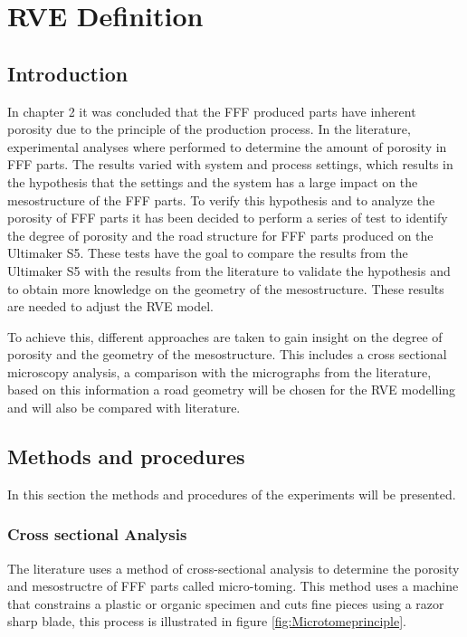 \chapter{RVE Definition}
\label{chp:4meso}



\section{Introduction}
In chapter 2 it was concluded that the FFF produced parts have inherent porosity due to the principle of the production process. In the literature, experimental analyses where performed to determine the amount of porosity in FFF parts. The results varied with system and process settings, which results in the hypothesis that the settings and the system has a large impact on the mesostructure of the FFF parts. To verify this hypothesis and to analyze the porosity of FFF parts it has been decided to perform a series of test to identify the degree of porosity and the road structure for FFF parts produced on the Ultimaker S5. These tests have the goal to compare the results from the Ultimaker S5 with the results from the literature to validate the hypothesis and to obtain more knowledge on the geometry of the mesostructure. These results are needed to adjust the RVE model.

To achieve this, different approaches are taken to gain insight on the degree of porosity and the geometry of the mesostructure. This includes a cross sectional microscopy analysis, a comparison with the micrographs from the literature, based on this information a road geometry will be chosen for the RVE modelling and will also be compared with literature.  %

\section{Methods and procedures}
In this section the methods and procedures of the experiments will be presented.
\subsection{Cross sectional Analysis}
The literature uses a method of cross-sectional analysis to determine the porosity and mesostructre of FFF parts called micro-toming. This method uses a machine that constrains a plastic or organic specimen and cuts fine pieces using a razor sharp blade, this process is illustrated in figure \ref{fig:Microtomeprinciple}.

